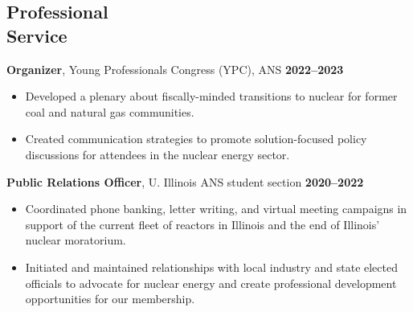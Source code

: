 \documentclass[margin,line]{resume}
\begin{document}
\begin{resume}


    \section{\mysidestyle Professional\\Service}

    \textbf{Organizer}, Young Professionals Congress (YPC), ANS \hfill \textbf{2022--2023}\vspace{.5mm}\\%
    \begin{itemize}
        \item Developed a plenary about fiscally-minded transitions to nuclear for former coal and natural gas communities.
        \item Created communication strategies to promote solution-focused policy discussions for attendees in the nuclear energy sector.
    \end{itemize}

    \textbf{Public Relations Officer}, U. Illinois ANS student section  \hfill \textbf{2020--2022}\vspace{.5mm}\\%
    \begin{itemize}
        \item Coordinated phone banking, letter writing, and virtual meeting campaigns in support of the current fleet of reactors in Illinois and the end of Illinois' nuclear moratorium.
        \item Initiated and maintained relationships with local industry and state elected officials to advocate for nuclear energy and create professional development opportunities for our membership.
    \end{itemize}


\end{resume}
\end{document}

